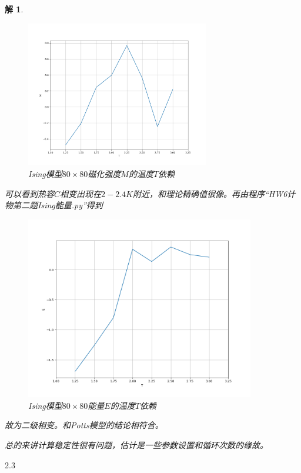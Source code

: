 \documentclass[10pt]{ctexart}
\newtheorem*{solution}{解}
\begin{document}
\begin{solution}
\begin{figure}[H]
\begin{minipage}{0.45\linewidth}
            \includegraphics[width=8cm]{Ising_M_80.png}
            \caption{Ising模型$80\times 80$磁化强度$M$的温度$T$依赖}
        \end{minipage}
    \end{figure}
    可以看到热容$C$相变出现在$2-2.4K$附近，和理论精确值很像。再由程序“HW6计物第二题Ising能量.py”得到
    \begin{figure}[H]
        \centering
        \includegraphics[width=10cm]{Ising_E_80.png}
        \caption{Ising模型$80\times 80$能量$E$的温度$T$依赖}
    \end{figure}
    故为二级相变。和Potts模型的结论相符合。

    总的来讲计算稳定性很有问题，估计是一些参数设置和循环次数的缘故。
\end{solution}
2.3
\end{document}
